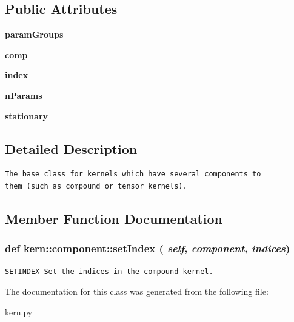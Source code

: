 \subsection*{Public Attributes}
\begin{CompactItemize}
\item 
\hypertarget{classkern_1_1component_b87e270b4f3b1b3ce51c039557bca0e4}{
\textbf{paramGroups}}
\label{classkern_1_1component_b87e270b4f3b1b3ce51c039557bca0e4}

\item 
\hypertarget{classkern_1_1component_cd02959e911a6abbc0a3d418683062c5}{
\textbf{comp}}
\label{classkern_1_1component_cd02959e911a6abbc0a3d418683062c5}

\item 
\hypertarget{classkern_1_1component_7538e7bd78d86d0cbde04e49fcf22f58}{
\textbf{index}}
\label{classkern_1_1component_7538e7bd78d86d0cbde04e49fcf22f58}

\item 
\hypertarget{classkern_1_1component_97b7665b53ba0cd1ac8123f0287d7d26}{
\textbf{nParams}}
\label{classkern_1_1component_97b7665b53ba0cd1ac8123f0287d7d26}

\item 
\hypertarget{classkern_1_1component_8b2736654a04aebbae1caa61afbfbf3a}{
\textbf{stationary}}
\label{classkern_1_1component_8b2736654a04aebbae1caa61afbfbf3a}

\end{CompactItemize}


\subsection{Detailed Description}


\footnotesize\begin{verbatim}The base class for kernels which have several components to
them (such as compound or tensor kernels).

\end{verbatim}
\normalsize
 

\subsection{Member Function Documentation}
\hypertarget{classkern_1_1component_120031427476d451ac010d51833f37e3}{
\subsubsection[{setIndex}]{\setlength{\rightskip}{0pt plus 5cm}def kern::component::setIndex ( {\em self}, \/   {\em component}, \/   {\em indices})}}
\label{classkern_1_1component_120031427476d451ac010d51833f37e3}




\footnotesize\begin{verbatim}SETINDEX Set the indices in the compound kernel.

\end{verbatim}
\normalsize
 

The documentation for this class was generated from the following file:\begin{CompactItemize}
\item 
kern.py\end{CompactItemize}
